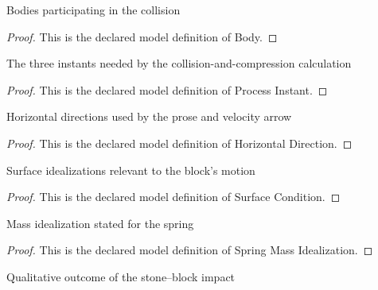 \begin{definition}[Body]
  \label{def:physics:phyx-mini-0763:phyxminiproblems-problemphyxmini0763-body}
  Bodies participating in the collision
\end{definition}
\begin{proof}
  This is the declared model definition of Body.
\end{proof}
\begin{definition}
  \label{def:physics:phyx-mini-0763:phyxminiproblems-problemphyxmini0763-processinstant}
  The three instants needed by the collision-and-compression calculation
\end{definition}
\begin{proof}
  This is the declared model definition of Process Instant.
\end{proof}
\begin{definition}
  \label{def:physics:phyx-mini-0763:phyxminiproblems-problemphyxmini0763-horizontaldirection}
  Horizontal directions used by the prose and velocity arrow
\end{definition}
\begin{proof}
  This is the declared model definition of Horizontal Direction.
\end{proof}
\begin{definition}
  \label{def:physics:phyx-mini-0763:phyxminiproblems-problemphyxmini0763-surfacecondition}
  Surface idealizations relevant to the block's motion
\end{definition}
\begin{proof}
  This is the declared model definition of Surface Condition.
\end{proof}
\begin{definition}
  \label{def:physics:phyx-mini-0763:phyxminiproblems-problemphyxmini0763-springmassidealization}
  Mass idealization stated for the spring
\end{definition}
\begin{proof}
  This is the declared model definition of Spring Mass Idealization.
\end{proof}
\begin{definition}
  \label{def:physics:phyx-mini-0763:phyxminiproblems-problemphyxmini0763-collisionoutcome}
  Qualitative outcome of the stone--block impact
\end{definition}
